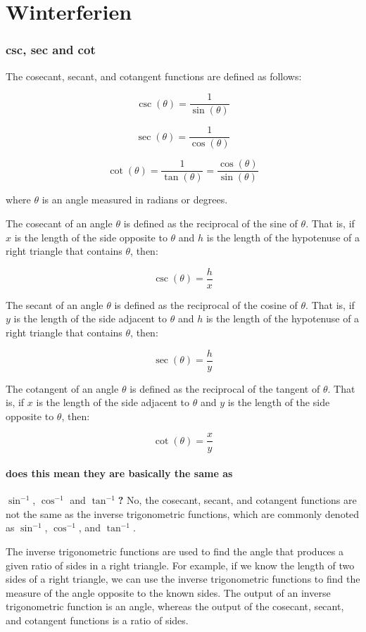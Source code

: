 \documentclass{report}
\begin{document}
\clearpage
\section{Winterferien}
\subsubsection{csc, sec and cot} %
\label{ssub:csc-sec-and-cot}
The cosecant, secant, and cotangent functions are defined as follows:

$$\csc(\theta) = \frac{1}{\sin(\theta)}$$

$$\sec(\theta) = \frac{1}{\cos(\theta)}$$

$$\cot(\theta) = \frac{1}{\tan(\theta)} = \frac{\cos(\theta)}{\sin(\theta)}$$

where $\theta$ is an angle measured in radians or degrees.

The cosecant of an angle $\theta$ is defined as the reciprocal of the sine of
$\theta$. That is, if $x$ is the length of the side opposite to $\theta$ and
$h$ is the length of the hypotenuse of a right triangle that contains $\theta$,
then:

$$\csc(\theta) = \frac{h}{x}$$

The secant of an angle $\theta$ is defined as the reciprocal of the cosine of
$\theta$. That is, if $y$ is the length of the side adjacent to $\theta$ and
$h$ is the length of the hypotenuse of a right triangle that contains $\theta$,
then:

$$\sec(\theta) = \frac{h}{y}$$

The cotangent of an angle $\theta$ is defined as the reciprocal of the tangent
of $\theta$. That is, if $x$ is the length of the side adjacent to $\theta$ and
$y$ is the length of the side opposite to $\theta$, then:

$$\cot(\theta) = \frac{x}{y}$$

\paragraph{does this mean they are basically the same as} $\sin^{-1}$, $\cos^{-1}$ and $\tan^{-1}$\textbf{?}
No, the cosecant, secant, and cotangent functions are not the same as the
inverse trigonometric functions, which are commonly denoted as $\sin^{-1}$,
$\cos^{-1}$, and $\tan^{-1}$.

The inverse trigonometric functions are used to find the angle that produces a
given ratio of sides in a right triangle. For example, if we know the length of
two sides of a right triangle, we can use the inverse trigonometric functions
to find the measure of the angle opposite to the known sides. The output of an
inverse trigonometric function is an angle, whereas the output of the cosecant,
secant, and cotangent functions is a ratio of sides.
\end{document}
